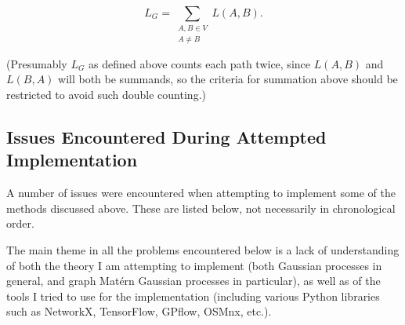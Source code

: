 \[
    L_G = \sum_{\substack{A, B \in V \\ A \neq B}} L(A, B).
\]

(Presumably $L_G$ as defined above counts each path twice, since $L(A, B)$ and $L(B, A)$ will both be summands, so the criteria for summation above should be restricted to avoid such double counting.)


\subsection{Issues Encountered During Attempted Implementation}

A number of issues were encountered when attempting to implement some of the methods discussed above. These are listed below, not necessarily in chronological order.

The main theme in all the problems encountered below is a lack of understanding of both the theory I am attempting to implement (both Gaussian processes in general, and graph Mat\'{e}rn Gaussian processes in particular), as well as of the tools I tried to use for the implementation (including various Python libraries such as NetworkX, TensorFlow, GPflow, OSMnx, etc.).

